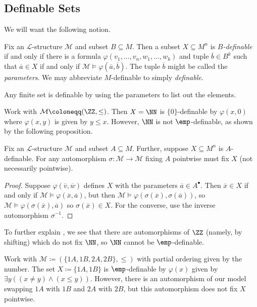\documentclass[../notes.tex]{subfiles}
\begin{document}
\subsection{Definable Sets}
We will want the following notion.
\begin{definition}[definable]
	Fix an $\mathcal L$-structure $\mathcal M$ and subset $B\subseteq M$. Then a subset $X\subseteq M^n$ is \textit{$B$-definable} if and only if there is a formula $\varphi(v_1,\ldots,v_n,w_1,\ldots,w_k)$ and tuple $\overline b\in B^k$ such that $\overline a\in X$ if and only if $\mathcal M\models\varphi(\overline a,\overline b)$. The tuple $\overline b$ might be called the \textit{parameters}. We may abbreviate $M$-definable to simply \textit{definable}.
\end{definition}
\begin{example}
	Any finite set is definable by using the parameters to list out the elements.
\end{example}
\begin{example} \label{ex:n-definable-in-z}
	Work with $\mathcal M\coloneqq(\ZZ,\le)$. Then $X=\NN$ is $\{0\}$-definable by $\varphi(x,0)$ where $\varphi(x,y)$ is given by $y\le x$. However, $\NN$ is not $\emp$-definable, as shown by the following proposition.
\end{example}
\begin{proposition}
	Fix an $\mathcal L$-structure $\mathcal M$ and subset $A\subseteq M$. Further, suppose $X\subseteq M^n$ is $A$-definable. For any automorphism $\sigma\colon\mathcal M\to\mathcal M$ fixing $A$ pointwise must fix $X$ (not necessarily pointwise).
\end{proposition}
\begin{proof}
	Suppose $\varphi(\overline v,\overline w)$ defines $X$ with the parameters $\overline a\in A^\bullet$. Then $\overline x\in X$ if and only if $\mathcal M\models\varphi(\overline x,\overline a)$, but then $\mathcal M\models\varphi(\sigma(\overline x),\sigma(\overline a))$, so $\mathcal M\models\varphi(\sigma(\overline x),\overline a)$ so $\sigma(\overline x)\in X$. For the converse, use the inverse automorphism $\sigma^{-1}$.
\end{proof}
To further explain , we see that there are automorphisms of $\ZZ$ (namely, by shifting) which do not fix $\NN$, so $\NN$ cannot be $\emp$-definable.
\begin{example}
	Work with $\mathcal M\coloneqq(\{1A,1B,2A,2B\},\le)$ with partial ordering given by the number. The set $X\coloneqq\{1A,1B\}$ is $\emp$-definable by $\varphi(x)$ given by $\exists y((x\ne y)\land(x\le y))$. However, there is an automorphism of our model swapping $1A$ with $1B$ and $2A$ with $2B$, but this automorphism does not fix $X$ pointwise.
\end{example}
\end{document}
